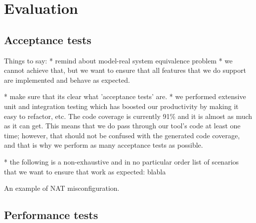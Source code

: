 \chapter{Evaluation}\label{chapter:eval}

\section{Acceptance tests}

Things to say:
* remind about model-real system equivalence problem
* we cannot achieve that, but we want to ensure that all features that we do
support are implemented and behave as expected.

* make sure that its clear what 'acceptance tests' are.
* we performed extensive unit and integration testing which has boosted our
productivity by making it easy to refactor, etc.  The code coverage is
currently 91\% and it is almost as much as it can get.  This means that we do
pass through our tool's code at least one time; however, that should not be
confused with the generated code coverage, and that is why we perform as many
acceptance tests as possible.

* the following is a non-exhaustive and in no particular order list of
scenarios that we want to ensure that work as expected: blabla

\begin{listing}[H]
  \caption{An example of NAT misconfiguration.}
  \label{lst:example}
\end{listing}

\section{Performance tests}
